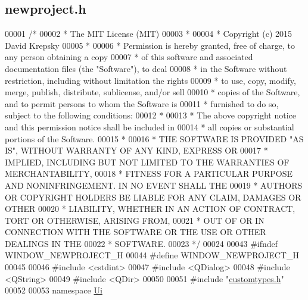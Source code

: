 \hypertarget{newproject_8h_source}{}\subsection{newproject.\+h}
\label{newproject_8h_source}

\begin{DoxyCode}
00001 \textcolor{comment}{/*}
00002 \textcolor{comment}{ * The MIT License (MIT)}
00003 \textcolor{comment}{ *}
00004 \textcolor{comment}{ * Copyright (c) 2015 David Krepsky}
00005 \textcolor{comment}{ *}
00006 \textcolor{comment}{ * Permission is hereby granted, free of charge, to any person obtaining a copy}
00007 \textcolor{comment}{ * of this software and associated documentation files (the "Software"), to deal}
00008 \textcolor{comment}{ * in the Software without restriction, including without limitation the rights}
00009 \textcolor{comment}{ * to use, copy, modify, merge, publish, distribute, sublicense, and/or sell}
00010 \textcolor{comment}{ * copies of the Software, and to permit persons to whom the Software is}
00011 \textcolor{comment}{ * furnished to do so, subject to the following conditions:}
00012 \textcolor{comment}{ *}
00013 \textcolor{comment}{ * The above copyright notice and this permission notice shall be included in}
00014 \textcolor{comment}{ * all copies or substantial portions of the Software.}
00015 \textcolor{comment}{ *}
00016 \textcolor{comment}{ * THE SOFTWARE IS PROVIDED "AS IS", WITHOUT WARRANTY OF ANY KIND, EXPRESS OR}
00017 \textcolor{comment}{ * IMPLIED, INCLUDING BUT NOT LIMITED TO THE WARRANTIES OF MERCHANTABILITY,}
00018 \textcolor{comment}{ * FITNESS FOR A PARTICULAR PURPOSE AND NONINFRINGEMENT. IN NO EVENT SHALL THE}
00019 \textcolor{comment}{ * AUTHORS OR COPYRIGHT HOLDERS BE LIABLE FOR ANY CLAIM, DAMAGES OR OTHER}
00020 \textcolor{comment}{ * LIABILITY, WHETHER IN AN ACTION OF CONTRACT, TORT OR OTHERWISE, ARISING FROM,}
00021 \textcolor{comment}{ * OUT OF OR IN CONNECTION WITH THE SOFTWARE OR THE USE OR OTHER DEALINGS IN THE}
00022 \textcolor{comment}{ * SOFTWARE.}
00023 \textcolor{comment}{ */}
00024 
00043 \textcolor{preprocessor}{#ifndef WINDOW\_NEWPROJECT\_H}
00044 \textcolor{preprocessor}{#define WINDOW\_NEWPROJECT\_H}
00045 
00046 \textcolor{preprocessor}{#include <cstdint>}
00047 \textcolor{preprocessor}{#include <QDialog>}
00048 \textcolor{preprocessor}{#include <QString>}
00049 \textcolor{preprocessor}{#include <QDir>}
00050 
00051 \textcolor{preprocessor}{#include "\hyperlink{customtypes_8h}{customtypes.h}"}
00052 
00053 \textcolor{keyword}{namespace }\hyperlink{namespace_ui}{Ui}

\end{DoxyCode}
